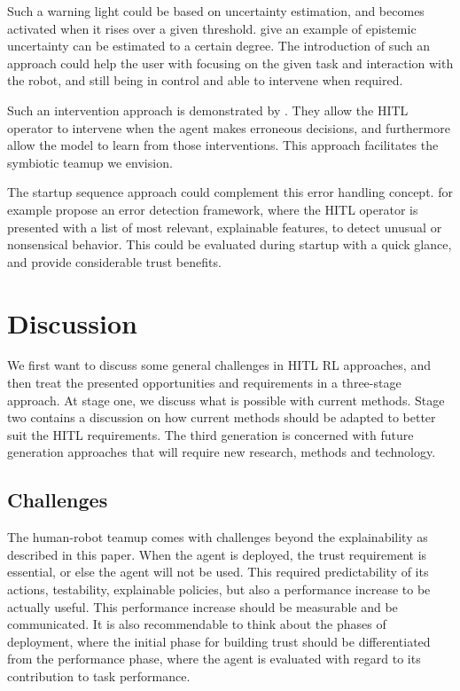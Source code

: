 \documentclass[twoside,11pt]{article}
\begin{document}
Such a warning light could be based on uncertainty estimation, and becomes activated when it rises over a given threshold. \citep{JainEtAl:2021:EpistemicUncertaintyPrediction} give an example of epistemic uncertainty can be estimated to a certain degree. The introduction of such an approach could help the user with focusing on the given task and interaction with the robot, and still being in control and able to intervene when required.

Such an intervention approach is demonstrated by \cite{WuEtAl:2021:HITLDRLAutonomousDriving}. They allow the HITL operator to intervene when the agent makes erroneous decisions, and furthermore allow the model to learn from those interventions. This approach facilitates the symbiotic teamup we envision.

The startup sequence approach could complement this error handling concept. \cite{LiuGuoMahmud:2021:HITLErrorDetectionFramework} for example propose an error detection framework, where the HITL operator is presented with a list of most relevant, explainable features, to detect unusual or nonsensical behavior. This could be evaluated during startup with a quick glance, and provide considerable trust benefits.


\section{Discussion}

We first want to discuss some general challenges in HITL RL approaches, and then treat the presented opportunities and requirements in a three-stage approach. At stage one, we discuss what is possible with current methods. Stage two contains a discussion on how current methods should be adapted to better suit the HITL requirements. The third generation is concerned with future generation approaches that will require new research, methods and technology.

\subsection{Challenges}


The human-robot teamup comes with challenges beyond the explainability as described in this paper. When the agent is deployed, the trust requirement is essential, or else the agent will not be used. This required predictability of its actions, testability, explainable policies, but also a performance increase to be actually useful. This performance increase should be measurable and be communicated. It is also recommendable to think about the phases of deployment, where the initial phase for building trust should be differentiated from the performance phase, where the agent is evaluated with regard to its contribution to task performance. 
\end{document}
